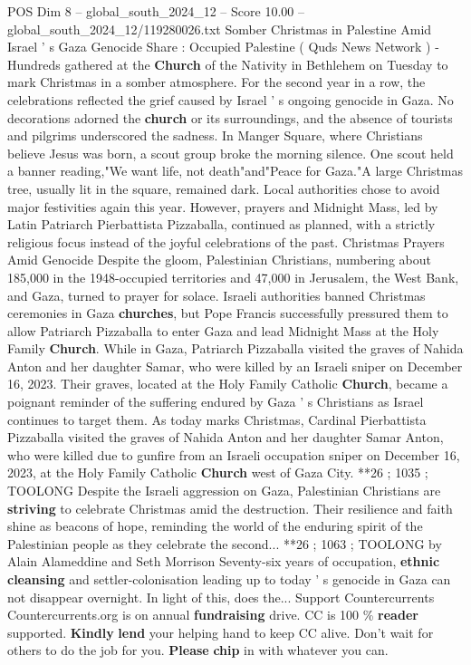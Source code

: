 \begin{textsample}{POS Dim 8 – global\_south\_2024\_12 – Score 10.00 – global\_south\_2024\_12/119280026.txt}  \label{ex:f8_pos_061}
Somber Christmas in Palestine Amid Israel ' s Gaza Genocide Share : Occupied Palestine ( Quds News Network ) - Hundreds gathered at the \textbf{Church} of the Nativity in Bethlehem on Tuesday to mark Christmas in a somber atmosphere.
For the second year in a row, the celebrations reflected the grief caused by Israel ' s ongoing genocide in Gaza.
No decorations adorned the \textbf{church} or its surroundings, and the absence of tourists and pilgrims underscored the sadness.
In Manger Square, where Christians believe Jesus was born, a scout group broke the morning silence.
One scout held a banner reading,"We want life, not death"and"Peace for Gaza."A large Christmas tree, usually lit in the square, remained dark.
Local authorities chose to avoid major festivities again this year.
However, prayers and Midnight Mass, led by Latin Patriarch Pierbattista Pizzaballa, continued as planned, with a strictly religious focus instead of the joyful celebrations of the past.
Christmas Prayers Amid Genocide Despite the gloom, Palestinian Christians, numbering about 185,000 in the 1948-occupied territories and 47,000 in Jerusalem, the West Bank, and Gaza, turned to prayer for solace.
Israeli authorities banned Christmas ceremonies in Gaza \textbf{churches}, but Pope Francis successfully pressured them to allow Patriarch Pizzaballa to enter Gaza and lead Midnight Mass at the Holy Family \textbf{Church}.
While in Gaza, Patriarch Pizzaballa visited the graves of Nahida Anton and her daughter Samar, who were killed by an Israeli sniper on December 16, 2023.
Their graves, located at the Holy Family Catholic \textbf{Church}, became a poignant reminder of the suffering endured by Gaza ' s Christians as Israel continues to target them.
As today marks Christmas, Cardinal Pierbattista Pizzaballa visited the graves of Nahida Anton and her daughter Samar Anton, who were killed due to gunfire from an Israeli occupation sniper on December 16, 2023, at the Holy Family Catholic \textbf{Church} west of Gaza City. **26 ; 1035 ; TOOLONG Despite the Israeli aggression on Gaza, Palestinian Christians are \textbf{striving} to celebrate Christmas amid the destruction.
Their resilience and faith shine as beacons of hope, reminding the world of the enduring spirit of the Palestinian people as they celebrate the second... **26 ; 1063 ; TOOLONG by Alain Alameddine and Seth Morrison Seventy-six years of occupation, \textbf{ethnic} \textbf{cleansing} and settler-colonisation leading up to today ' s genocide in Gaza can not disappear overnight.
In light of this, does the...
Support Countercurrents Countercurrents.org is on annual \textbf{fundraising} drive.
CC is 100 \% \textbf{reader} supported. \textbf{Kindly} \textbf{lend} your helping hand to keep CC alive.
Don't wait for others to do the job for you. \textbf{Please} \textbf{chip} in with whatever you can.

\end{textsample}
